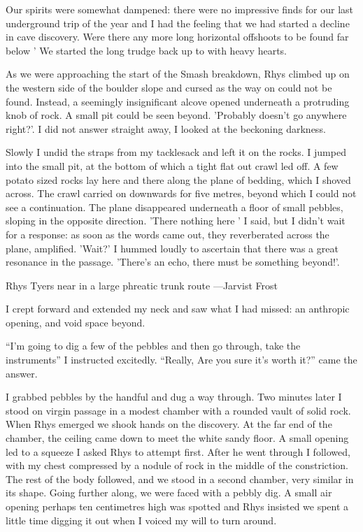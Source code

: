 Our spirits were somewhat dampened: there were no impressive finds for our last underground trip of the year and I had the feeling that we had started a decline in cave discovery. Were there any more long horizontal offshoots to be found far below ' We started the long trudge back up to  with heavy hearts.

As we were approaching the start of the Smash breakdown, Rhys climbed up on the western side of the boulder slope and cursed as the way on could not be found. Instead, a seemingly insignificant alcove opened underneath a protruding knob of rock. A small pit could be seen beyond. 'Probably doesn't go anywhere right?'. I did not answer straight away, I looked at the beckoning darkness.

Slowly I undid the straps from my tacklesack and left it on the rocks. I jumped into the small  pit, at the bottom of which a tight flat out crawl led off. A few potato sized rocks lay here and there along the plane of bedding, which I shoved across. The crawl carried on downwards for five metres, beyond which I could not see a continuation. The plane disappeared underneath a floor of small pebbles, sloping in the opposite direction. 'There nothing here ' I said, but I didn't wait for a response: as soon as the words came out, they reverberated across the plane, amplified. 'Wait?' I hummed loudly to ascertain that there was a great resonance in the passage. 'There's an echo, there must be something beyond!'.
\begin{marginfigure}
	\checkoddpage \ifoddpage \forcerectofloat \else \forceversofloat \fi
	\centering
	\caption{Rhys Tyers near  in a large phreatic trunk route ---Jarvist Frost}
	\label{near duck}
\end{marginfigure}


I crept forward and extended my neck and saw what I had missed: an anthropic opening, and void space beyond. 

``I'm going to dig a few of the pebbles and then go through, take the instruments'' I instructed excitedly. ``Really, Are you sure it's worth it?'' came the answer. 

I grabbed pebbles by the handful and dug a way through. Two minutes later I stood on virgin passage in a modest chamber with a rounded vault of solid rock. When Rhys emerged we shook hands on the discovery. At the far end of the chamber, the ceiling came down to meet the white sandy floor. A small opening led to a squeeze I asked Rhys to attempt first. After he went through I followed, with my chest compressed by a nodule of rock in the middle of the constriction. The rest of the body followed, and we stood in a second chamber, very similar in its shape. Going further along, we were faced with a pebbly dig. A small air opening perhaps ten centimetres high was spotted and Rhys insisted we spent a little time digging it out when I voiced my will to turn around. 

